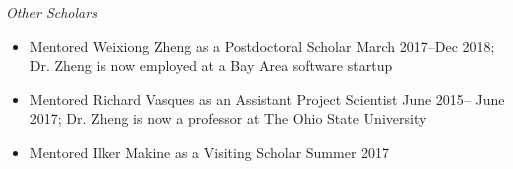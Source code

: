 
\textit{Other Scholars}
\begin{itemize}
\item Mentored Weixiong Zheng as a Postdoctoral Scholar March 2017--Dec 2018; Dr. Zheng is now employed at a Bay Area software startup 
\item Mentored Richard Vasques as an Assistant Project Scientist June 2015-- June 2017; Dr. Zheng is now a professor at The Ohio State University
\item Mentored Ilker Makine as a Visiting Scholar Summer 2017
\end{itemize}

